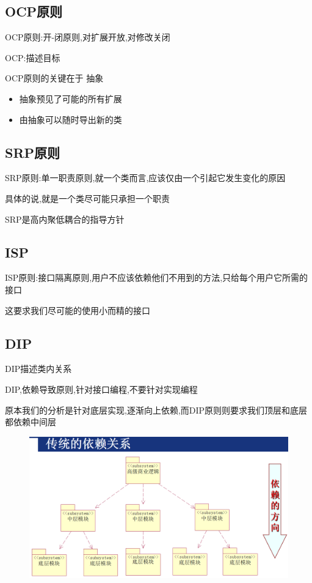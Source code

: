 \documentclass[UTF8,a4paper]{ctexart}
\begin{document}
\subsection{OCP原则}
OCP原则:开-闭原则,对扩展开放,对修改关闭

OCP:描述目标

OCP原则的关键在于 抽象
\begin{itemize}
  \item 抽象预见了可能的所有扩展
  \item 由抽象可以随时导出新的类
\end{itemize}

\subsection{SRP原则}
SRP原则:单一职责原则,就一个类而言,应该仅由一个引起它发生变化的原因

具体的说,就是一个类尽可能只承担一个职责

SRP是高内聚低耦合的指导方针

\subsection{ISP}
ISP原则:接口隔离原则,用户不应该依赖他们不用到的方法,只给每个用户它所需的接口

这要求我们尽可能的使用小而精的接口

\subsection{DIP}
DIP描述类内关系

DIP,依赖导致原则,针对接口编程,不要针对实现编程

原本我们的分析是针对底层实现,逐渐向上依赖,而DIP原则则要求我们顶层和底层都依赖中间层

\begin{figure}[H]
  \centering
  \includegraphics[scale = 0.3]{assets/SoftwareEngineering_17391.png}
\end{figure}
\end{document}
